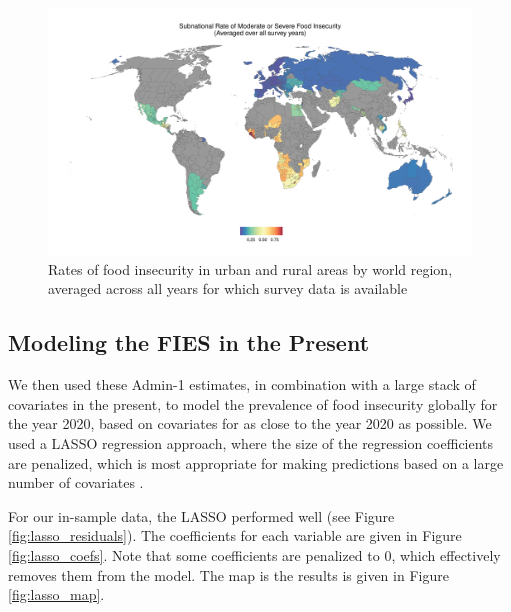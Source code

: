 \documentclass{article}
\begin{document}
\begin{figure}[h]
	\centering
	\includegraphics[width=\linewidth]{../figures/subnational-moderate.png}
	\caption{Rates of food insecurity in urban and rural areas by world region, averaged across all years for which survey data is available}
	\label{fig:disaggregated}
\end{figure}

\subsection{Modeling the FIES in the Present}
We then used these Admin-1 estimates, in combination with a large stack of covariates in the present, to model the prevalence of food insecurity globally for the year 2020, based on covariates for as close to the year 2020 as possible.  We used a LASSO regression approach, where the size of the regression coefficients are penalized, which is most appropriate for making predictions based on a large number of covariates \cite{Tibshirani2011}.

For our in-sample data, the LASSO performed well (see Figure \ref{fig:lasso_residuals}).  The coefficients for each variable are given in Figure \ref{fig:lasso_coefs}.  Note that some coefficients are penalized to 0, which effectively removes them from the model.  The map is the results is given in Figure \ref{fig:lasso_map}.
\end{document}
